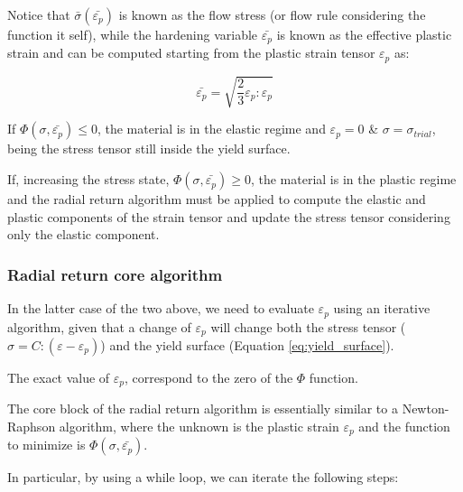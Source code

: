 Notice that $\bar{\sigma}(\bar{\varepsilon_p})$ is known as the flow stress (or flow rule considering the function it self), while the hardening variable $\bar{\varepsilon_p}$ is known as the effective plastic strain and can be computed starting from the plastic strain tensor $\varepsilon_p$ as:

\begin{equation}
    \bar{\varepsilon_p} = \sqrt{\frac{2}{3} \varepsilon_p : \varepsilon_p}
\end{equation}

If $\Phi(\sigma, \bar{\varepsilon_p}) \le 0$, the material is in the elastic regime and $\varepsilon_p = 0$ \& $\sigma = \sigma_{trial}$, being the stress tensor still inside the yield surface.

If, increasing the stress state, $\Phi(\sigma, \bar{\varepsilon_p}) \geq 0$, the material is in the plastic regime and the radial return algorithm must be applied to compute the elastic and plastic components of the strain tensor and update the stress tensor considering only the elastic component.



\subsubsection{Radial return core algorithm}

In the latter case of the two above, we need to evaluate $\varepsilon_p$ using an iterative algorithm, given that a change of $\varepsilon_p$ will change both the stress tensor ($\sigma = C : (\varepsilon - \varepsilon_p)$) and the yield surface (Equation \ref{eq:yield_surface}).

The exact value of $\varepsilon_p$, correspond to the zero of the $\Phi$ function.

The core block of the radial return algorithm is essentially similar to a Newton-Raphson algorithm, where the unknown is the plastic strain $\varepsilon_p$ and the function to minimize is $\Phi(\sigma, \bar{\varepsilon_p})$.

In particular, by using a while loop, we can iterate the following steps:


